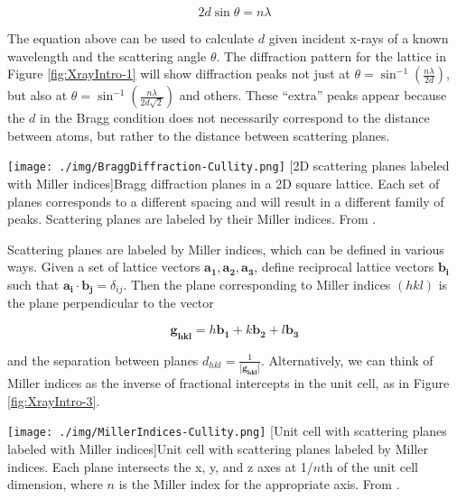 \begin{equation}
2d \sin \theta = n \lambda
\end{equation}

The equation above can be used to calculate $d$ given incident x-rays of a known wavelength and the scattering angle $\theta$. The diffraction pattern for the lattice in Figure \ref{fig:XrayIntro-1} will show diffraction peaks not just at $\theta = \sin^{-1} \left( \frac{n \lambda}{2d} \right)$, but also at $\theta = \sin^{-1} \left( \frac{n \lambda}{2d\sqrt{2}} \right)$ and others. These ``extra'' peaks appear because the $d$ in the Bragg condition does not necessarily correspond to the distance between atoms, but rather to the distance between scattering planes.

\begin{centering}
\texttt{[image: ./img/BraggDiffraction-Cullity.png]}
  \captionsetup{width=0.75\textwidth}
  [2D scattering planes labeled with Miller indices]{Bragg diffraction planes in a 2D square lattice. Each set of planes corresponds to a different spacing and will result in a different family of peaks. Scattering planes are labeled by their Miller indices. From \cite{Cullity2014}.} 
  \label{fig:XrayIntro-2}
\end{centering}

Scattering planes are labeled by Miller indices, which can be defined in various ways. Given a set of lattice vectors $\mathbf{a_{1}},\mathbf{a_{2}},\mathbf{a_{3}}$, define reciprocal lattice vectors $\mathbf{b_{i}}$ such that $\mathbf{a_{i}} \cdot \mathbf{b_{j}} = \delta_{ij}$. Then the plane corresponding to Miller indices $(hkl)$ is the plane perpendicular to the vector

\begin{equation}
\mathbf{g_{hkl}} = h \mathbf{b_{1}} + k \mathbf{b_{2}} + l \mathbf{b_{3}}
\end{equation}

and the separation between planes $d_{hkl} = \frac{1}{|\mathbf{g_{hkl}}|}$. Alternatively, we can think of Miller indices as the inverse of fractional intercepts in the unit cell, as in Figure \ref{fig:XrayIntro-3}.

\begin{centering}
\texttt{[image: ./img/MillerIndices-Cullity.png]}
  \captionsetup{width=0.75\textwidth}
  [Unit cell with scattering planes labeled with Miller indices]{Unit cell with scattering planes labeled by Miller indices. Each plane intersects the x, y, and z axes at 1/$n$th of the unit cell dimension, where $n$ is the Miller index for the appropriate axis. From \cite{Cullity2014}.} 
  \label{fig:XrayIntro-3}
\end{centering}

